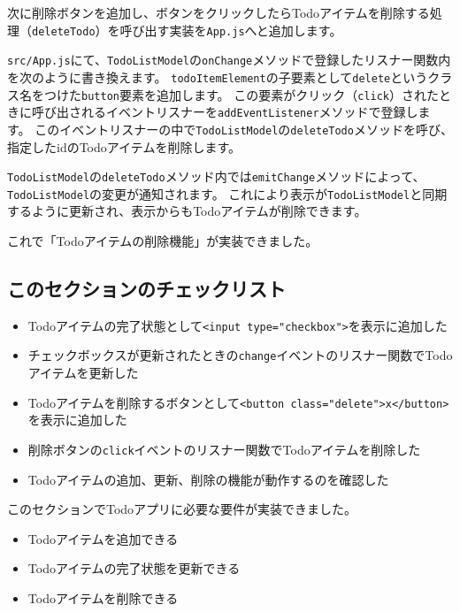 次に削除ボタンを追加し、ボタンをクリックしたらTodoアイテムを削除する処理（\texttt{deleteTodo}）を呼び出す実装を\texttt{App.js}へと追加します。

\texttt{src/App.js}にて、\texttt{TodoListModel}の\texttt{onChange}メソッドで登録したリスナー関数内を次のように書き換えます。
\texttt{todoItemElement}の子要素として\texttt{delete}というクラス名をつけた\texttt{button}要素を追加します。
この要素がクリック（\texttt{click}）されたときに呼び出されるイベントリスナーを\texttt{addEventListener}メソッドで登録します。
このイベントリスナーの中で\texttt{TodoListModel}の\texttt{deleteTodo}メソッドを呼び、指定したidのTodoアイテムを削除します。



\texttt{TodoListModel}の\texttt{deleteTodo}メソッド内では\texttt{emitChange}メソッドによって、\texttt{TodoListModel}の変更が通知されます。
これにより表示が\texttt{TodoListModel}と同期するように更新され、表示からもTodoアイテムが削除できます。

これで「Todoアイテムの削除機能」が実装できました。

\hypertarget{section-checklist}{%
\subsection{このセクションのチェックリスト}\label{section-checklist}}

\begin{itemize}
\item
  Todoアイテムの完了状態として\texttt{<input type="checkbox">}を表示に追加した
\item
  チェックボックスが更新されたときの\texttt{change}イベントのリスナー関数でTodoアイテムを更新した
\item
  Todoアイテムを削除するボタンとして\texttt{<button class="delete">x</button>}を表示に追加した
\item
  削除ボタンの\texttt{click}イベントのリスナー関数でTodoアイテムを削除した
\item
  Todoアイテムの追加、更新、削除の機能が動作するのを確認した
\end{itemize}

このセクションでTodoアプリに必要な要件が実装できました。

\begin{itemize}
\item
  Todoアイテムを追加できる
\item
  Todoアイテムの完了状態を更新できる
\item
  Todoアイテムを削除できる
\end{itemize}

